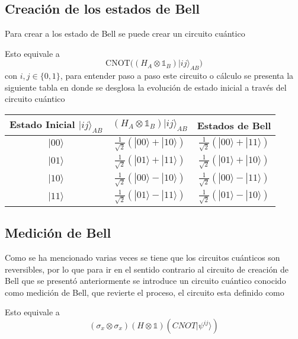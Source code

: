 \documentclass[a4paper]{article}
\begin{document}
\subsection{Creación de los estados de Bell}
Para crear a los estado de Bell se puede crear un circuito cuántico

Esto equivale a 
\begin{equation}
\text{CNOT}\bigg((H_A\otimes\mathbb{1}_B)|ij\rangle_{AB} \bigg)
\end{equation}
con $i,j\in\{0,1\}$, para entender paso a paso este circuito o cálculo se presenta la siguiente tabla en donde se desglosa la evolución de estado inicial a través del circuito cuántico
\begin{center}
\begin{tabular}{ |c|c|c| } 
 \hline
 Estado Inicial $|ij\rangle_{AB} $ & $(H_A\otimes\mathbb{1}_B)|ij\rangle_{AB}$ & Estados de Bell \\ \hline
 $|00\rangle$  & $\frac{1}{\sqrt{2}}(|00\rangle+|10\rangle)$   &  $\frac{1}{\sqrt{2}}(|00\rangle+|11\rangle)$\\\hline
 $|01\rangle$  & $\frac{1}{\sqrt{2}}(|01\rangle+|11\rangle)$   &  $\frac{1}{\sqrt{2}}(|01\rangle+|10\rangle)$\\\hline
 $|10\rangle$  & $\frac{1}{\sqrt{2}}(|00\rangle-|10\rangle)$   &  $\frac{1}{\sqrt{2}}(|00\rangle-|11\rangle)$\\\hline
 $|11\rangle$  & $\frac{1}{\sqrt{2}}(|01\rangle-|11\rangle)$   &  $\frac{1}{\sqrt{2}}(|01\rangle-|10\rangle)$\\
 \hline
\end{tabular}
\end{center}
\subsection{Medición de Bell}
Como se ha mencionado varias veces se tiene que los circuitos cuánticos son reversibles, por lo que para ir en el sentido contrario al circuito de creación de Bell que se presentó anteriormente se introduce un circuito cuántico conocido como medición de Bell, que revierte el proceso, el circuito esta definido como 

Esto equivale a 
\begin{equation}
(\sigma_x\otimes\sigma_x)(H\otimes\mathbb{1})(CNOT|\psi^{ij}\rangle)
\end{equation}
\end{document}
